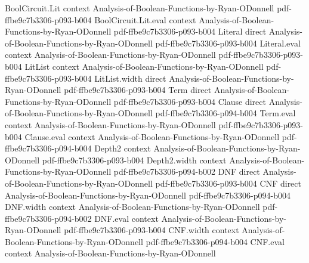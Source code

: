 \begin{theorem}
\label{LMN.restriction_compose_eq}
\leanok
{}
\proofstep
  {BoolCircuit.Lit}
  {context}
  {Analysis-of-Boolean-Functions-by-Ryan-ODonnell}
  {pdf-ffbe9c7b3306-p093-b004}
\proofstep
  {BoolCircuit.Lit.eval}
  {context}
  {Analysis-of-Boolean-Functions-by-Ryan-ODonnell}
  {pdf-ffbe9c7b3306-p093-b004}
\proofstep
  {Literal}
  {direct}
  {Analysis-of-Boolean-Functions-by-Ryan-ODonnell}
  {pdf-ffbe9c7b3306-p093-b004}
\proofstep
  {Literal.eval}
  {context}
  {Analysis-of-Boolean-Functions-by-Ryan-ODonnell}
  {pdf-ffbe9c7b3306-p093-b004}
\proofstep
  {LitList}
  {context}
  {Analysis-of-Boolean-Functions-by-Ryan-ODonnell}
  {pdf-ffbe9c7b3306-p093-b004}
\proofstep
  {LitList.width}
  {direct}
  {Analysis-of-Boolean-Functions-by-Ryan-ODonnell}
  {pdf-ffbe9c7b3306-p093-b004}
\proofstep
  {Term}
  {direct}
  {Analysis-of-Boolean-Functions-by-Ryan-ODonnell}
  {pdf-ffbe9c7b3306-p093-b004}
\proofstep
  {Clause}
  {direct}
  {Analysis-of-Boolean-Functions-by-Ryan-ODonnell}
  {pdf-ffbe9c7b3306-p094-b004}
\proofstep
  {Term.eval}
  {context}
  {Analysis-of-Boolean-Functions-by-Ryan-ODonnell}
  {pdf-ffbe9c7b3306-p093-b004}
\proofstep
  {Clause.eval}
  {context}
  {Analysis-of-Boolean-Functions-by-Ryan-ODonnell}
  {pdf-ffbe9c7b3306-p094-b004}
\proofstep
  {Depth2}
  {context}
  {Analysis-of-Boolean-Functions-by-Ryan-ODonnell}
  {pdf-ffbe9c7b3306-p093-b004}
\proofstep
  {Depth2.width}
  {context}
  {Analysis-of-Boolean-Functions-by-Ryan-ODonnell}
  {pdf-ffbe9c7b3306-p094-b002}
\proofstep
  {DNF}
  {direct}
  {Analysis-of-Boolean-Functions-by-Ryan-ODonnell}
  {pdf-ffbe9c7b3306-p093-b004}
\proofstep
  {CNF}
  {direct}
  {Analysis-of-Boolean-Functions-by-Ryan-ODonnell}
  {pdf-ffbe9c7b3306-p094-b004}
\proofstep
  {DNF.width}
  {context}
  {Analysis-of-Boolean-Functions-by-Ryan-ODonnell}
  {pdf-ffbe9c7b3306-p094-b002}
\proofstep
  {DNF.eval}
  {context}
  {Analysis-of-Boolean-Functions-by-Ryan-ODonnell}
  {pdf-ffbe9c7b3306-p093-b004}
\proofstep
  {CNF.width}
  {context}
  {Analysis-of-Boolean-Functions-by-Ryan-ODonnell}
  {pdf-ffbe9c7b3306-p094-b004}
\proofstep
  {CNF.eval}
  {context}
  {Analysis-of-Boolean-Functions-by-Ryan-ODonnell}

\end{theorem}
